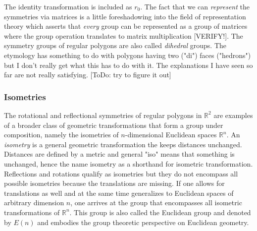 The identity transformation is included as $r_0$. The fact that we can \emph{represent} the symmetries via matrices is a little foreshadowing into the field of representation theory which asserts that \emph{every} group can be represented as a group of matrices where the group operation translates to matrix multiplication [VERIFY!]. The symmetry groups of regular polygons are also called \emph{dihedral} groups. The etymology has something to do with polygons having two ("di") faces ("hedrons") but I don't really get what this has to do with it. The explanations I have seen so far are not really satisfying. [ToDo: try to figure it out]





\subsubsection{Isometries}
The rotational and reflectional symmetries of regular polygons in $\mathbb{R}^2$ are examples of a broader class of geometric transformations that form a group under composition, namely the isometries of $n$-dimensional Euclidean spaces $\mathbb{R}^n$. An \emph{isometry} is a general geometric transformation the keeps distances unchanged. Distances are defined by a metric and general "iso" means that something is unchanged, hence the name isometry as a shorthand for isometric transformation. Reflections and rotations qualify as isometries but they do not encompass all possible isometries because the translations are missing. If one allows for translations as well and at the same time generalizes to Euclidean spaces of arbitrary dimension $n$, one arrives at the group that encompasses all isometric transformations of $\mathbb{R}^n$. This group is also called the Euclidean group and denoted by $E(n)$ and embodies the group theoretic perspective on Euclidean geometry.


